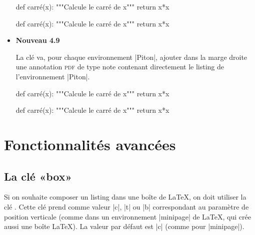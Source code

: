 \documentclass[dvipsnames,svgnames]{article}
\begin{document}
\begin{itemize}
\medskip
\begin{Code}
\begin{Piton}[\emph{paperclip},background-color=gray!15]
def carré(x):
    """Calcule le carré de x"""
    return x*x
\end{Piton}    
\end{Code}

\medskip
\begin{Piton}[paperclip,background-color=gray!15]
def carré(x):
    """Calcule le carré de x"""
    return x*x
\end{Piton}    


\item {}
\colorbox{yellow!50}{\textbf{Nouveau 4.9}}

\nobreak
La clé  va, pour chaque environnement |{Piton}|, ajouter
dans la marge droite une annotation \textsc{pdf} de type note contenant
directement le listing de l'environnement |{Piton}|.

\medskip
\begin{Code}
\begin{Piton}[\emph{annotation},background-color=gray!15]
def carré(x):
    """Calcule le carré de x"""
    return x*x
\end{Piton}    
\end{Code}

\medskip
\begin{Piton}[annotation,background-color=gray!15]
def carré(x):
    """Calcule le carré de x"""
    return x*x
\end{Piton}    


\end{itemize}

\section{Fonctionnalités avancées}

\subsection{La clé «box»}

\label{box}


\nobreak
\smallskip
Si on souhaite composer un listing dans une boîte de LaTeX, on doit utiliser la clé
. Cette clé prend comme valeur |c|, |t| ou |b| correspondant
au paramètre de position verticale (comme dans un environnement |{minipage}| de LaTeX, qui
crée aussi une boîte LaTeX). La valeur par défaut est |c| (comme pour |{minipage}|).
\end{document}
